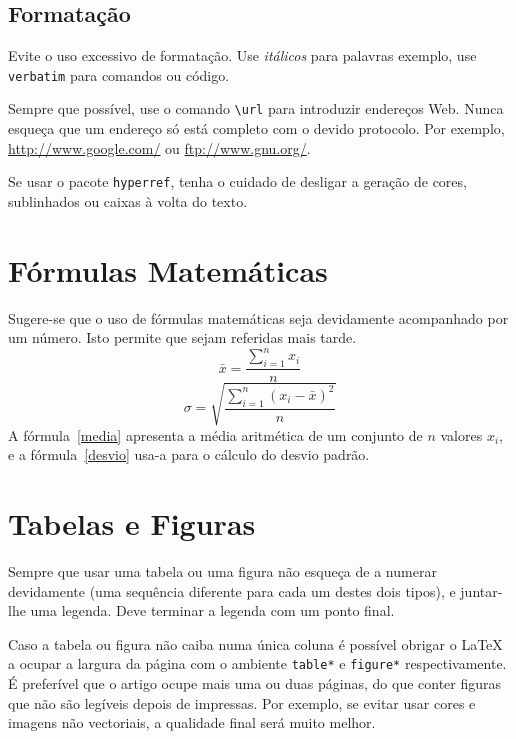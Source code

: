 \documentclass[a4paper, twocolumn, 11pt, twoside]{article}
\begin{document}
\subsection{Formatação}

Evite o uso excessivo de formatação. Use \textit{itálicos} para
palavras exemplo, use \texttt{verbatim} para comandos ou código.

Sempre que possível, use o comando \verb.\url. para introduzir
endereços Web. Nunca esqueça que um endereço só está completo com o
devido protocolo. Por exemplo, \url{http://www.google.com/} ou
\url{ftp://www.gnu.org/}.

Se usar o pacote \texttt{hyperref}, tenha o cuidado de desligar a
geração de cores, sublinhados ou caixas à volta do texto.

\section{Fórmulas Matemáticas}

Sugere-se que o uso de fórmulas matemáticas seja devidamente acompanhado por um número.
Isto permite que sejam referidas mais tarde.
\begin{equation}
  \label{media}
  \bar{x} = \frac{\sum_{i=1}^n x_i}{n}
\end{equation}
\begin{equation}
  \label{desvio}
  \sigma = \sqrt{\frac{\sum_{i=1}^n \left(x_i - \bar{x}\right)^2}{n}}
\end{equation}
A fórmula~\ref{media} apresenta a média aritmética de um conjunto de
$n$ valores $x_i$, e a fórmula~\ref{desvio} usa-a para o cálculo do
desvio padrão.

\section{Tabelas e Figuras}

Sempre que usar uma tabela ou uma figura não esqueça de a numerar
devidamente (uma sequência diferente para cada um destes dois tipos),
e juntar-lhe uma legenda.  Deve terminar a legenda com um ponto final.

Caso a tabela ou figura não caiba numa única coluna é possível obrigar
o \LaTeX{} a ocupar a largura da página com o ambiente \verb!table*! e
\verb!figure*! respectivamente. É preferível que o artigo ocupe mais
uma ou duas páginas, do que conter figuras que não são legíveis depois
de impressas. Por exemplo, se evitar usar cores e imagens não
vectoriais, a qualidade final será muito melhor.
\end{document}
